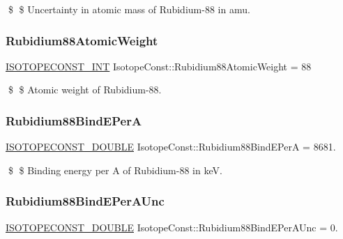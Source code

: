 \$ \$ Uncertainty in atomic mass of Rubidium-\/88 in amu. \mbox{\label{group___isotope_const-_rubidium-_rb88_ga3e1db3d5526b482489c0dae3ea308647}} 
\subsubsection{\texorpdfstring{Rubidium88\+Atomic\+Weight}{Rubidium88AtomicWeight}}
{\footnotesize\ttfamily \mbox{\hyperlink{group___isotope_const-_macros_ga5f18360b3e99483a35c32d789e62621c}{I\+S\+O\+T\+O\+P\+E\+C\+O\+N\+S\+T\+\_\+\+I\+NT}} Isotope\+Const\+::\+Rubidium88\+Atomic\+Weight = 88}

\$ \$ Atomic weight of Rubidium-\/88. \mbox{\label{group___isotope_const-_rubidium-_rb88_ga078c6e62807dda090f2351c4485bcf41}} 
\subsubsection{\texorpdfstring{Rubidium88\+Bind\+E\+PerA}{Rubidium88BindEPerA}}
{\footnotesize\ttfamily \mbox{\hyperlink{group___isotope_const-_macros_ga8f45a7272ce02c0b4c65c44636ed719a}{I\+S\+O\+T\+O\+P\+E\+C\+O\+N\+S\+T\+\_\+\+D\+O\+U\+B\+LE}} Isotope\+Const\+::\+Rubidium88\+Bind\+E\+PerA = 8681.}

\$ \$ Binding energy per A of Rubidium-\/88 in keV. \mbox{\label{group___isotope_const-_rubidium-_rb88_gaab443bec81d9abc9914c2dbafef47fb5}} 
\subsubsection{\texorpdfstring{Rubidium88\+Bind\+E\+Per\+A\+Unc}{Rubidium88BindEPerAUnc}}
{\footnotesize\ttfamily \mbox{\hyperlink{group___isotope_const-_macros_ga8f45a7272ce02c0b4c65c44636ed719a}{I\+S\+O\+T\+O\+P\+E\+C\+O\+N\+S\+T\+\_\+\+D\+O\+U\+B\+LE}} Isotope\+Const\+::\+Rubidium88\+Bind\+E\+Per\+A\+Unc = 0.}

